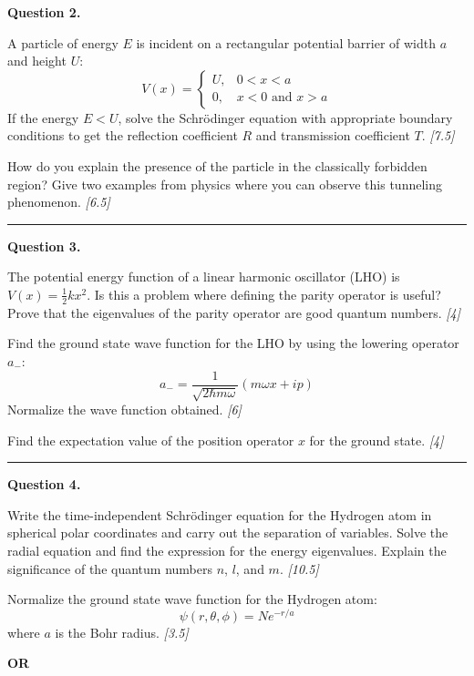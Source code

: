 \documentclass[11pt,a4paper]{article}
\newcommand{\pts}[1]{\hfill   \textit{[#1]}}
\begin{document}
\noindent   \textbf{Question 2.}

\begin{parts}
  \item A particle of energy $E$ is incident on a rectangular potential barrier of width $a$ and height $U$:
    \[ V(x) = 
\begin{cases} U, & 0 < x < a \\ 0, & x < 0  \text{ and } x > a \end{cases} \]
    If the energy $E < U$, solve the Schr\"{o}dinger equation with appropriate boundary conditions to get the reflection coefficient $R$ and transmission coefficient $T$. \pts{7.5}
  \item How do you explain the presence of the particle in the classically forbidden region? Give two examples from physics where you can observe this tunneling phenomenon. \pts{6.5}
\end{parts}

\medskip\rule{\linewidth}{0.2pt}




\noindent   \textbf{Question 3.}

\begin{parts}
  \item The potential energy function of a linear harmonic oscillator (LHO) is $V(x) = \frac{1}{2} k x^2$. Is this a problem where defining the parity operator is useful? Prove that the eigenvalues of the parity operator are good quantum numbers. \pts{4}
  \item Find the ground state wave function for the LHO by using the lowering operator $a_-$:
    \[ a_- = \frac{1}{\sqrt{2\hbar m\omega}} (m\omega x + ip) \]
    Normalize the wave function obtained. \pts{6}
  \item Find the expectation value of the position operator $x$ for the ground state. \pts{4}
\end{parts}

\medskip\rule{\linewidth}{0.2pt}




\noindent   \textbf{Question 4.}

\begin{parts}
  \item Write the time-independent Schr\"{o}dinger equation for the Hydrogen atom in spherical polar coordinates and carry out the separation of variables. Solve the radial equation and find the expression for the energy eigenvalues. Explain the significance of the quantum numbers $n$, $l$, and $m$. \pts{10.5}
  \item Normalize the ground state wave function for the Hydrogen atom:
    \[ \psi(r,  \theta, \phi) = N e^{-r/a} \]
    where $a$ is the Bohr radius. \pts{3.5}
\end{parts}
\hfill   \textbf{OR}
\end{document}
